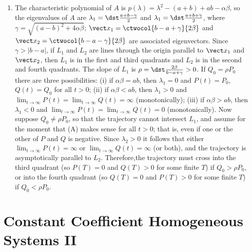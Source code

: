\documentclass[openany]{book}
\newenvironment{sectionSolutions}{
 \begin{enumerate}[item-label={\thesection.\arabic{enumi}.}]
}{
 \end{enumerate}
}
\begin{document}
\begin{sectionSolutions}
\addtocounter{enumi}{12}
\item%
The characteristic polynomial of $A$ is
$p(\lambda)=\lambda^2-(a+b)+ab-\alpha\beta$, so the eigenvalues of $A$
are $\lambda_1=\dst\frac{a+b-\gamma}{2}$ and
$\lambda_1=\dst\frac{a+b+\gamma}{2}$, where
$\gamma=\sqrt{(a-b)^2+4\alpha\beta}$; ${\vect
x}_1=\ctwocol{b-a+\gamma}{2\beta}$ and ${\vect
x}_2=\ctwocol{b-a-\gamma}{2\beta}$ are associated eigenvectors. Since
$\gamma>|b-a|$, if $L_1$ and $L_2$ are lines through the origin
parallel to ${\vect x}_1$ and ${\vect x}_2$, then $L_1$ is in the first and
third quadrants and $L_2$ is in the second and fourth quadrants. The
slope of $L_1$ is $\rho=\dst\frac{2\beta}{ b-a+\gamma}>0$. If $Q_0=\rho
P_0$ there are three possibilities: (i) if $\alpha\beta=ab$, then
$\lambda_1=0$ and $P(t)=P_0$, $Q(t)=Q_0$ for all $t>0$; (ii) if
$\alpha\beta<ab$, then $\lambda_1>0$ and
$\lim_{t\to\infty}P(t)=\lim_{t\to\infty}Q(t)=\infty$ (monotonically);
(iii) if $\alpha\beta>ab$, then $\lambda_1<0$ and
$\lim_{t\to\infty}P(t)=\lim_{t\to\infty}Q(t)=0$ (monotonically). Now
suppose $Q_0\ne\rho P_0$, so that the trajectory cannot intersect
$L_1$, and assume for the moment that (A) makes sense for all $t>0$;
that is, even if one or the other of $P$ and $Q$ is negative. Since
$\lambda_2>0$ it follows that either $\lim_{t\to\infty}P(t)=\infty$ or
$\lim_{t\to\infty}Q(t)=\infty$ (or both), and the trajectory is
asymptotically parallel to $L_2$. Therefore,the trajectory must cross
into the third quadrant (so $P(T)=0$ and $Q(T)>0$ for some finite $T$)
if $Q_0>\rho P_0$, or into the fourth quadrant (so $Q(T)=0$ and
$P(T)>0$ for some finite $T$) if $Q_0<\rho P_0$.
\end{sectionSolutions}

\section{Constant Coefficient Homogeneous Systems II}
\end{document}
